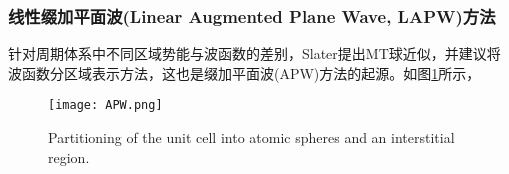 \subsubsection{线性缀加平面波(Linear Augmented Plane Wave, LAPW)方法}
针对周期体系中不同区域势能与波函数的差别，Slater提出MT球近似，并建议将波函数分区域表示方法\cite{PR51-846_1937,PR91-528_1953}，这也是缀加平面波(APW)方法的起源。如图\ref{Muffin_tin_0}所示，%
\begin{figure}[h!]
\centering
\texttt{[image: APW.png]}
\caption{\small \textrm{Partitioning of the unit cell into atomic spheres and an interstitial region.}}%
\label{Muffin_tin_0}
\end{figure}

